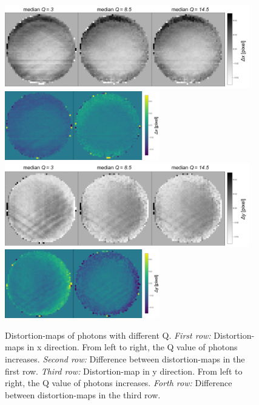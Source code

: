 \documentclass[12pt, preprint]{aastex61}
\begin{document}
\begin{figure}[p]
\begin{center}
\includegraphics[width=0.95\textwidth]{figures/q-x-new}
\includegraphics[width=0.6\textwidth]{figures/dif-q-x-new}
\includegraphics[width=0.95\textwidth]{figures/q-y-new}
\includegraphics[width=0.6\textwidth]{figures/dif-q-y-new}

\end{center}
\caption{%
  \label{distortion_q}
  Distortion-maps of photons with different Q.
  \emph{First row:} Distortion-maps in x direction. 
  From left to right, the Q value of photons increases.
  \emph{Second row:} Difference between distortion-maps in the first row.
  \emph{Third row:} Distortion-map in y direction.
  From left to right, the Q value of photons increases.
  \emph{Forth row:} Difference between distortion-maps in the third row.
  }
\end{figure}
\end{document}
